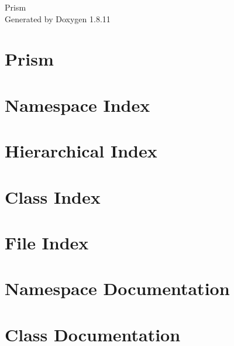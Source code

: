 \documentclass[twoside]{book}
\newcommand{\+}{\discretionary{\mbox{\scriptsize$\hookleftarrow$}}{}{}}
\newcommand{\clearemptydoublepage}{%
  \newpage{\pagestyle{empty}\cleardoublepage}%
}
\begin{document}
\hypersetup{pageanchor=false,
             bookmarksnumbered=true,
             pdfencoding=unicode
            }
\begin{titlepage}
\vspace*{7cm}
\begin{center}%
{\Large Prism }\\
\vspace*{1cm}
{\large Generated by Doxygen 1.8.11}\\
\end{center}
\end{titlepage}
\clearemptydoublepage
\tableofcontents
\clearemptydoublepage
{}
\hypersetup{pageanchor=true}

\chapter{Prism}
\label{md_README}
\hypertarget{md_README}{}

\chapter{Namespace Index}

\chapter{Hierarchical Index}

\chapter{Class Index}

\chapter{File Index}

\chapter{Namespace Documentation}

\chapter{Class Documentation}





























\end{document}
